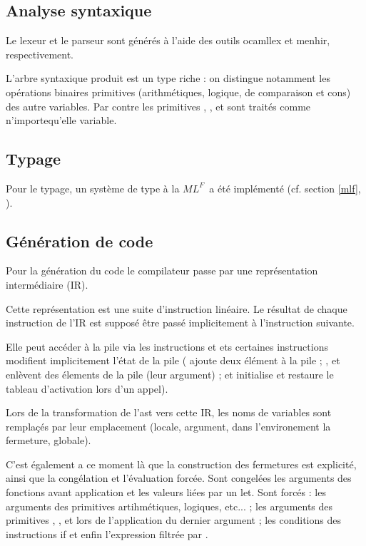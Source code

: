\documentclass[a4paper]{article}
\def\mlf{$ML^F$}
\begin{document}
\subsection{Analyse syntaxique}
Le lexeur et le parseur sont générés à l'aide des outils ocamllex et menhir, respectivement.

L'arbre syntaxique produit est un type riche : on distingue notamment les opérations binaires primitives (arithmétiques, logique, de comparaison et cons) des autre variables. Par contre les primitives , ,  et  sont traités comme n'importequ'elle variable.

\subsection{Typage}
Pour le typage, un système de type \og à la \mlf \fg ~a été implémenté
(cf. section \ref{mlf}, ). %

\subsection{Génération de code}
Pour la génération du code le compilateur passe par une représentation intermédiaire (IR).

Cette représentation est une suite d'instruction linéaire. Le résultat de chaque instruction de l'IR est supposé être passé implicitement à l'instruction suivante.

Elle peut accéder à la pile via les instructions  et  ets certaines instructions modifient implicitement l'état de la pile ( ajoute deux élément à la pile ; ,  et  enlèvent des élements de la pile (leur argument) ;  et  initialise et restaure le tableau d'activation lors d'un appel).

Lors de la transformation de l'ast vers cette IR, les noms de
variables sont remplaçés par leur emplacement (locale, argument, dans
l'environement la fermeture, globale).

C'est également a ce moment là que la construction des fermetures est
explicité, ainsi que la congélation et l'évaluation forcée. Sont
congelées les arguments des fonctions avant application et les valeurs
liées par un let. Sont forcés : les arguments des primitives
artihmétiques, logiques, etc... ; les arguments des primitives
, ,  et  lors de
l'application du dernier argument ; les conditions des instructions if
et enfin l'expression filtrée par .
\end{document}
